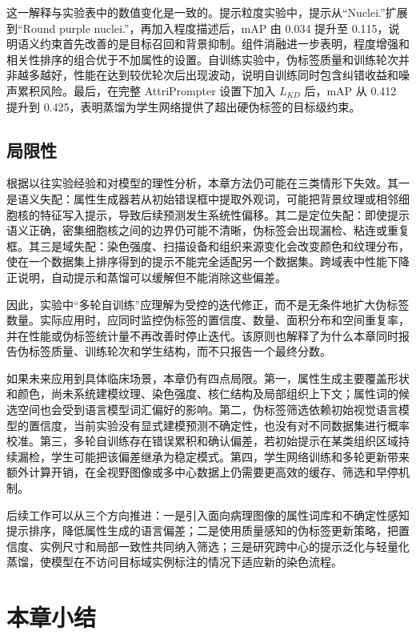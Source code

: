 这一解释与实验表中的数值变化是一致的。提示粒度实验中，提示从“Nuclei.”扩展到“Round purple nuclei.”，再加入程度描述后，mAP 由 0.034 提升至 0.115，说明语义约束首先改善的是目标召回和背景抑制。组件消融进一步表明，程度增强和相关性排序的组合优于不加属性的设置。自训练实验中，伪标签质量和训练轮次并非越多越好，性能在达到较优轮次后出现波动，说明自训练同时包含纠错收益和噪声累积风险。最后，在完整 AttriPrompter 设置下加入 $L_{KD}$ 后，mAP 从 0.412 提升到 0.425，表明蒸馏为学生网络提供了超出硬伪标签的目标级约束。

\subsection{局限性}

根据以往实验经验和对模型的理性分析，本章方法仍可能在三类情形下失效。其一是语义失配：属性生成器若从初始错误框中提取外观词，可能把背景纹理或相邻细胞核的特征写入提示，导致后续预测发生系统性偏移。其二是定位失配：即使提示语义正确，密集细胞核之间的边界仍可能不清晰，伪标签会出现漏检、粘连或重复框。其三是域失配：染色强度、扫描设备和组织来源变化会改变颜色和纹理分布，使在一个数据集上排序得到的提示不能完全适配另一个数据集。跨域表中性能下降正说明，自动提示和蒸馏可以缓解但不能消除这些偏差。

因此，实验中“多轮自训练”应理解为受控的迭代修正，而不是无条件地扩大伪标签数量。实际应用时，应同时监控伪标签的置信度、数量、面积分布和空间重复率，并在性能或伪标签统计量不再改善时停止迭代。该原则也解释了为什么本章同时报告伪标签质量、训练轮次和学生结构，而不只报告一个最终分数。

如果未来应用到具体临床场景，本章仍有四点局限。第一，属性生成主要覆盖形状和颜色，尚未系统建模纹理、染色强度、核仁结构及局部组织上下文；属性词的候选空间也会受到语言模型词汇偏好的影响。第二，伪标签筛选依赖初始视觉语言模型的置信度，当前实验没有显式建模预测不确定性，也没有对不同数据集进行概率校准。第三，多轮自训练存在错误累积和确认偏差，若初始提示在某类组织区域持续漏检，学生可能把该偏差继承为稳定模式。第四，学生网络训练和多轮更新带来额外计算开销，在全视野图像或多中心数据上仍需要更高效的缓存、筛选和早停机制。

后续工作可以从三个方向推进：一是引入面向病理图像的属性词库和不确定性感知提示排序，降低属性生成的语言偏差；二是使用质量感知的伪标签更新策略，把置信度、实例尺寸和局部一致性共同纳入筛选；三是研究跨中心的提示泛化与轻量化蒸馏，使模型在不访问目标域实例标注的情况下适应新的染色流程。

\section{本章小结}

